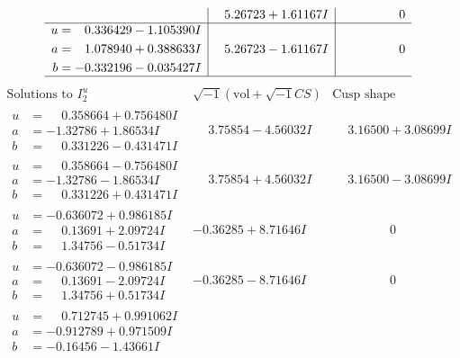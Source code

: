 \documentclass[1p]{elsarticle_modified}
\theoremstyle{definition}
\newcommand{\I}{\sqrt{-1}}
\begin{document}
$$\begin{array}{c|c|c}
 & \phantom{-}5.26723 + 1.61167 I & \phantom{-0.000000 } 0 \\ \hline\begin{aligned}
u &= \phantom{-}0.336429 - 1.105390 I \\
a &= \phantom{-}1.078940 + 0.388633 I \\
b &= -0.332196 - 0.035427 I\end{aligned}
 & \phantom{-}5.26723 - 1.61167 I & \phantom{-0.000000 } 0\\
 \hline 
 \end{array}$$\newpage$$\begin{array}{c|c|c}  
\text{Solutions to }I^u_{2}& \I (\text{vol} + \sqrt{-1}CS) & \text{Cusp shape}\\
 \hline 
\begin{aligned}
u &= \phantom{-}0.358664 + 0.756480 I \\
a &= -1.32786 + 1.86534 I \\
b &= \phantom{-}0.331226 - 0.431471 I\end{aligned}
 & \phantom{-}3.75854 - 4.56032 I & \phantom{-}3.16500 + 3.08699 I \\ \hline\begin{aligned}
u &= \phantom{-}0.358664 - 0.756480 I \\
a &= -1.32786 - 1.86534 I \\
b &= \phantom{-}0.331226 + 0.431471 I\end{aligned}
 & \phantom{-}3.75854 + 4.56032 I & \phantom{-}3.16500 - 3.08699 I \\ \hline\begin{aligned}
u &= -0.636072 + 0.986185 I \\
a &= \phantom{-}0.13691 + 2.09724 I \\
b &= \phantom{-}1.34756 - 0.51734 I\end{aligned}
 & -0.36285 + 8.71646 I & \phantom{-0.000000 } 0 \\ \hline\begin{aligned}
u &= -0.636072 - 0.986185 I \\
a &= \phantom{-}0.13691 - 2.09724 I \\
b &= \phantom{-}1.34756 + 0.51734 I\end{aligned}
 & -0.36285 - 8.71646 I & \phantom{-0.000000 } 0 \\ \hline\begin{aligned}
u &= \phantom{-}0.712745 + 0.991062 I \\
a &= -0.912789 + 0.971509 I \\
b &= -0.16456 - 1.43661 I\end{aligned}

\end{array}$$
\end{document}
